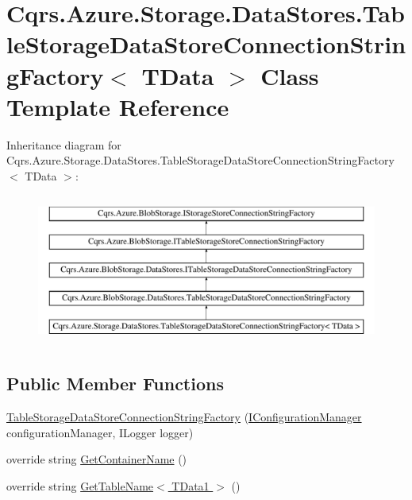\hypertarget{classCqrs_1_1Azure_1_1Storage_1_1DataStores_1_1TableStorageDataStoreConnectionStringFactory}{}\section{Cqrs.\+Azure.\+Storage.\+Data\+Stores.\+Table\+Storage\+Data\+Store\+Connection\+String\+Factory$<$ T\+Data $>$ Class Template Reference}
\label{classCqrs_1_1Azure_1_1Storage_1_1DataStores_1_1TableStorageDataStoreConnectionStringFactory}
Inheritance diagram for Cqrs.\+Azure.\+Storage.\+Data\+Stores.\+Table\+Storage\+Data\+Store\+Connection\+String\+Factory$<$ T\+Data $>$\+:\begin{figure}[H]
\begin{center}
\leavevmode
\includegraphics[height=5.000000cm]{classCqrs_1_1Azure_1_1Storage_1_1DataStores_1_1TableStorageDataStoreConnectionStringFactory}
\end{center}
\end{figure}
\subsection*{Public Member Functions}
\begin{DoxyCompactItemize}
\item 
\hyperlink{classCqrs_1_1Azure_1_1Storage_1_1DataStores_1_1TableStorageDataStoreConnectionStringFactory_a72218c0219be3c3185ae98893f0d91e3}{Table\+Storage\+Data\+Store\+Connection\+String\+Factory} (\hyperlink{interfaceCqrs_1_1Configuration_1_1IConfigurationManager}{I\+Configuration\+Manager} configuration\+Manager, I\+Logger logger)
\item 
override string \hyperlink{classCqrs_1_1Azure_1_1Storage_1_1DataStores_1_1TableStorageDataStoreConnectionStringFactory_aa31a217ca659f298016bd8ecabe98387}{Get\+Container\+Name} ()
\item 
override string \hyperlink{classCqrs_1_1Azure_1_1Storage_1_1DataStores_1_1TableStorageDataStoreConnectionStringFactory_a386df8c514b08c9c39583ea9e9a9abe6}{Get\+Table\+Name$<$ T\+Data1 $>$} ()
\end{DoxyCompactItemize}
